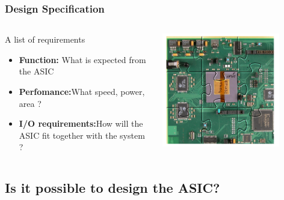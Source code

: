 \documentclass[compress]{beamer}
\begin{document}
\begin{frame}
	\frametitle{Design Specification}
	\begin{columns}	
		\begin{block}{A list of requirements}
			\begin{itemize}
				\item \textbf{Function:}\newline
				What is expected
				from the ASIC 
				\item \textbf{Perfomance:}\newline What speed, power,
				area ?
				\item \textbf{I/O requirements:}\newline How will the ASIC fit
				together with the
				system ?
			\end{itemize}
		\end{block}
		
		\begin{center}
			\includegraphics[width=0.8\textwidth]{chip}
		\end{center}
	\end{columns}
\end{frame}
\subsection[Feasibility ]{Is it possible to design the ASIC?}
\end{document}

